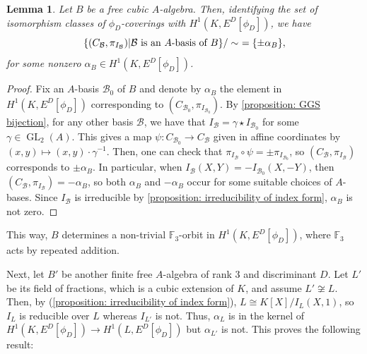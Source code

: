 \documentclass[oneside]{amsart}
\newcommand{\FF}{\mathbb{F}}
\DeclareMathOperator{\gl}{GL}
\newtheorem{lemma}[X]{Lemma}
\theoremstyle{definition}
\begin{document}
\begin{lemma}
    Let $B$ be a free cubic $A$-algebra. Then, identifying the set of isomorphism classes of $\phi_D$-coverings with $H^1(K,E^D[\phi_D])$, we have
    $$
    \{(C_{\mathcal{B}}, \pi_{I_{\mathcal{B}}}) | \mathcal{B} \textnormal{ is an }A\textnormal{-basis of }B\}/\sim \ = \{\pm\alpha_B\},
    $$
    for some nonzero $\alpha_B \in H^1(K,E^D[\phi_D])$.
\end{lemma}
\begin{proof}
    Fix an $A$-basis $\mathcal{B}_0$ of $B$ and denote by $\alpha_B$ the element in $H^1(K,E^D[\phi_D])$ corresponding to $(C_{\mathcal{B}_0},\pi_{I_{\mathcal{B}_0}})$. By \ref{proposition: GGS bijection}, for any other basis $\mathcal{B}$, we have that $I_{\mathcal{B}} = \gamma\star I_{\mathcal{B}_0}$ for some $\gamma \in \gl_2(A)$. This gives a map $\psi:C_{\mathcal{B}_0} \to C_{\mathcal{B}}$ given in affine coordinates by $(x,y)\mapsto (x,y)\cdot\gamma^{-1}$. Then, one can check that $\pi_{I_{\mathcal{B}}}\circ\psi = \pm \pi_{I_{\mathcal{B}_0}}$, so $(C_{\mathcal{B}},\pi_{I_\mathcal{B}})$ corresponds to $\pm\alpha_B$. In particular, when $I_{\mathcal{B}}(X,Y) = -I_{\mathcal{B}_0}(X,-Y)$, then $(C_{\mathcal{B}},\pi_{I_\mathcal{B}}) = -\alpha_B$, so both $\alpha_B$ and $-\alpha_{B}$ occur for some suitable choices of $A$-bases. Since $I_{\mathcal{B}}$ is irreducible by \ref{proposition: irreducibility of index form}, $\alpha_B$ is not zero.
\end{proof}

This way, $B$ determines a non-trivial $\mathbb{F}_3$-orbit in $H^1(K, E^D[\phi_D])$, where $\FF_3$ acts by repeated addition. 

Next, let $B'$ be another finite free $A$-algebra of rank 3 and discriminant $D$. Let $L'$ be its field of fractions, which is a cubic extension of $K$, and assume $L'\not\cong L$. Then, by (\ref{proposition: irreducibility of index form}), $L \cong K[X]/I_{L}(X,1)$, so $I_{L}$ is reducible over $L$ whereas $I_{L'}$ is not. Thus, $\alpha_L$ is in the kernel of $H^1(K, E^D[\phi_D]) \to H^1(L, E^D[\phi_D])$ but $\alpha_{L'}$ is not. This proves the following result:
\end{document}
